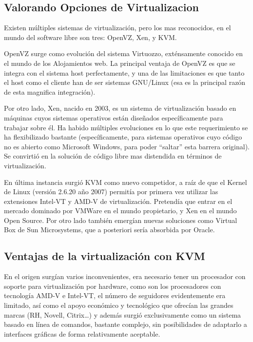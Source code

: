 \subsection{Valorando Opciones de Virtualizacion}

Existen múltiples sistemas de virtualización, pero los mas reconocidos, en el mundo del software libre son tres: OpenVZ, Xen, y KVM. 

OpenVZ surge como evolución del sistema Virtuozzo, exténsamente conocido en el mundo de los Alojamientos web. La principal ventaja de OpenVZ es que se integra con el sistema host perfectamente, y una de las limitaciones es que tanto el host como el cliente han de ser sistemas GNU/Linux (esa es la principal razón de esta magnifica integración). 

Por otro lado, Xen, nacido en 2003, es un sistema de virtualización basado en máquinas cuyos sistemas operativos están diseñados específicamente para trabajar sobre él. Ha habido múltiples evoluciones en lo que este requerimiento se ha flexibilizado bastante (específicamente, para sistemas operativos cuyo código no es abierto como Microsoft Windows, para poder “saltar” esta barrera original). Se convirtió en la solución de código libre mas distendida en términos de virtualización.

En última instancia surgió KVM como nuevo competidor, a raíz de que el Kernel de Linux (versión 2.6.20 año 2007) permitía por primera vez utilizar las extensiones Intel-VT y AMD-V de virtualización. Pretendía que entrar en el mercado dominado por VMWare en el mundo propietario, y Xen en el mundo Open Source. Por otro lado también emergían nuevas soluciones como Virtual Box de Sun Microsystems, que a posteriori sería absorbida por Oracle.

\subsection{Ventajas de la virtualización con KVM}

En el origen surgían varios inconvenientes, era necesario tener un procesador con soporte para virtualización por hardware, como son los procesadores con tecnología AMD-V e Intel-VT, el número de seguidores evidentemente era limitado, así como el apoyo económico y tecnológico que ofrecían las grandes marcas (RH, Novell, Citrix…) y además surgió exclusivamente como un sistema basado en línea de comandos, bastante complejo, sin posibilidades de adaptarlo a interfaces gráficas de forma relativamente aceptable.

